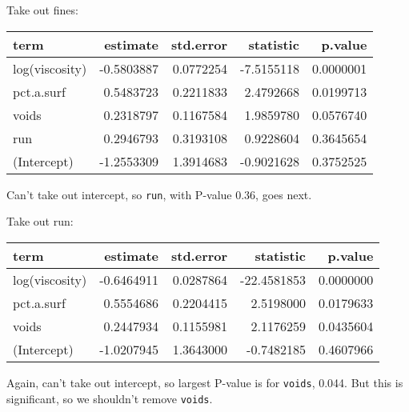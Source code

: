 \begin{frame}[fragile]{Take out fines:}
\protect\hypertarget{take-out-fines}{}
\begin{Shaded}
\begin{Highlighting}[]
\NormalTok{ \textless{}{-}}\StringTok{ }\OperatorTok{\textasciitilde{}}\StringTok{ }\OperatorTok{{-}}\StringTok{ }
\NormalTok{) }\OperatorTok{\%\textgreater{}\%}\StringTok{ }
\end{Highlighting}
\end{Shaded}

\begin{longtable}[]{@{}lrrrr@{}}
\toprule
term & estimate & std.error & statistic & p.value\tabularnewline
\midrule
\endhead
log(viscosity) & -0.5803887 & 0.0772254 & -7.5155118 &
0.0000001\tabularnewline
pct.a.surf & 0.5483723 & 0.2211833 & 2.4792668 &
0.0199713\tabularnewline
voids & 0.2318797 & 0.1167584 & 1.9859780 & 0.0576740\tabularnewline
run & 0.2946793 & 0.3193108 & 0.9228604 & 0.3645654\tabularnewline
(Intercept) & -1.2553309 & 1.3914683 & -0.9021628 &
0.3752525\tabularnewline
\bottomrule
\end{longtable}

Can't take out intercept, so \texttt{run}, with P-value 0.36, goes next.
\end{frame}

\begin{frame}[fragile]{Take out run:}
\protect\hypertarget{take-out-run}{}
\begin{Shaded}
\begin{Highlighting}[]
\NormalTok{ \textless{}{-}}\StringTok{ }\OperatorTok{\textasciitilde{}}\StringTok{ }\OperatorTok{{-}}\StringTok{ }
\NormalTok{) }\OperatorTok{\%\textgreater{}\%}\StringTok{ }
\end{Highlighting}
\end{Shaded}

\begin{longtable}[]{@{}lrrrr@{}}
\toprule
term & estimate & std.error & statistic & p.value\tabularnewline
\midrule
\endhead
log(viscosity) & -0.6464911 & 0.0287864 & -22.4581853 &
0.0000000\tabularnewline
pct.a.surf & 0.5554686 & 0.2204415 & 2.5198000 &
0.0179633\tabularnewline
voids & 0.2447934 & 0.1155981 & 2.1176259 & 0.0435604\tabularnewline
(Intercept) & -1.0207945 & 1.3643000 & -0.7482185 &
0.4607966\tabularnewline
\bottomrule
\end{longtable}

Again, can't take out intercept, so largest P-value is for
\texttt{voids}, 0.044. But this is significant, so we shouldn't remove
\texttt{voids}.
\end{frame}


